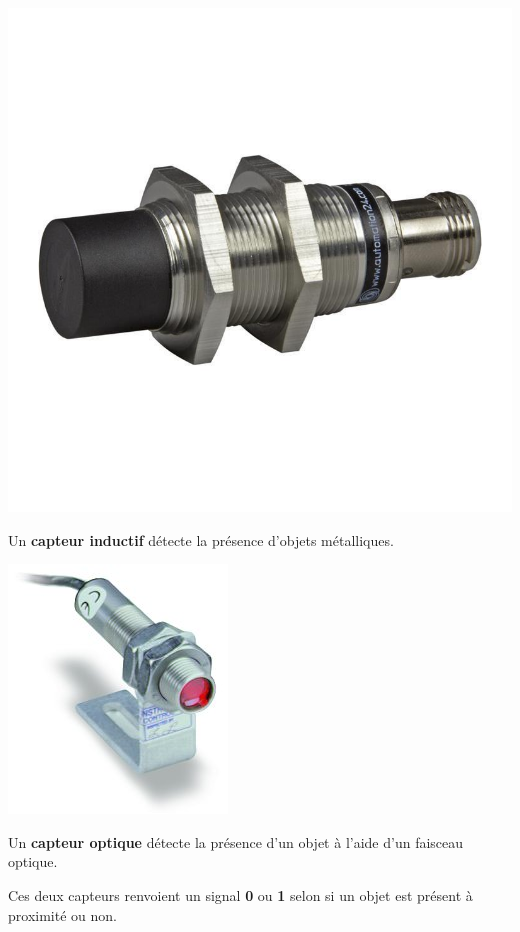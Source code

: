 \begin{UPSTIactivite}


	 \begin{minipage}[t]{.45\textwidth}
	\begin{center}
		\includegraphics[width=.4\textwidth,height=.4\textheight,keepaspectratio]{images/capt_inductif}
	\end{center}


		Un \textbf{capteur inductif} détecte la présence d'objets métalliques.
	\end{minipage}\hfill
	\begin{minipage}[t]{.45\textwidth}
	\begin{center}
		\includegraphics[width=.4\textwidth,height=.3\textheight,keepaspectratio]{images/capt_optique}
	\end{center}
		Un \textbf{capteur optique} détecte la présence d'un objet à l'aide d'un faisceau optique.
	\end{minipage}

	Ces deux capteurs renvoient un signal \textbf{0} ou \textbf{1} selon si un objet est présent à proximité ou non.




\end{UPSTIactivite}
